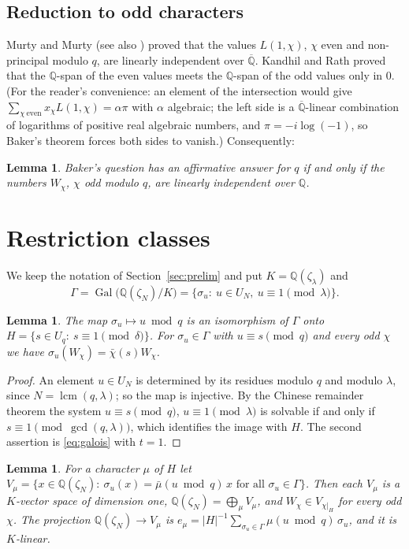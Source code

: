 \documentclass[11pt]{amsart}
\newtheorem{lemma}[theorem]{Lemma}
\theoremstyle{definition}
\theoremstyle{remark}
\providecommand{\Q}{\mathbb Q}
\newcommand{\Qb}{\overline{\mathbb Q}}
\DeclareMathOperator{\Gal}{Gal}
\numberwithin{equation}{section}
\begin{document}
\subsection{Reduction to odd characters}
Murty and Murty \cite{MM11} (see also \cite[Theorem~3]{KR22}) proved that the values $L(1,\chi)$, $\chi$ even and non-principal modulo $q$, are linearly independent over $\Qb$.
Kandhil and Rath \cite[Theorem~5]{KR22} proved that the $\Q$-span of the even values meets the $\Q$-span of the odd values only in $0$.
(For the reader's convenience: an element of the intersection would give $\sum_{\chi\ \mathrm{even}}x_\chi L(1,\chi)=\alpha\pi$ with $\alpha$ algebraic; the left side is a $\Qb$-linear combination of logarithms of positive real algebraic numbers, and $\pi=-i\log(-1)$, so Baker's theorem forces both sides to vanish.)
Consequently:

\begin{lemma}\label{lem:oddpart}
Baker's question has an affirmative answer for $q$ if and only if the numbers $W_\chi$, $\chi$ odd modulo $q$, are linearly independent over $\Q$.
\end{lemma}
\section{Restriction classes}\label{sec:classes}

We keep the notation of Section~\ref{sec:prelim} and put $K=\Q(\zeta_\lambda)$ and
\[
\Gamma=\Gal\bigl(\Q(\zeta_N)/K\bigr)=\{\sigma_u:\ u\in U_N,\ u\equiv1\pmod\lambda\}.
\]

\begin{lemma}\label{lem:Gamma}
The map $\sigma_u\mapsto u\bmod q$ is an isomorphism of $\Gamma$ onto $H=\{s\in U_q:\ s\equiv1\pmod\delta\}$.
For $\sigma_u\in\Gamma$ with $u\equiv s\pmod q$ and every odd $\chi$ we have $\sigma_u(W_\chi)=\bar\chi(s)W_\chi$.
\end{lemma}

\begin{proof}
An element $u\in U_N$ is determined by its residues modulo $q$ and modulo $\lambda$, since $N=\operatorname{lcm}(q,\lambda)$; so the map is injective.
By the Chinese remainder theorem the system $u\equiv s\pmod q$, $u\equiv1\pmod\lambda$ is solvable if and only if $s\equiv1\pmod{\gcd(q,\lambda)}$, which identifies the image with $H$.
The second assertion is \eqref{eq:galois} with $t=1$.
\end{proof}

\begin{lemma}\label{lem:eigen}
For a character $\mu$ of $H$ let $V_\mu=\{x\in\Q(\zeta_N):\ \sigma_u(x)=\bar\mu(u\bmod q)\,x\text{ for all }\sigma_u\in\Gamma\}$.
Then each $V_\mu$ is a $K$-vector space of dimension one, $\Q(\zeta_N)=\bigoplus_\mu V_\mu$, and $W_\chi\in V_{\chi|_H}$ for every odd $\chi$.
The projection $\Q(\zeta_N)\to V_\mu$ is $e_\mu=|H|^{-1}\sum_{\sigma_u\in\Gamma}\mu(u\bmod q)\,\sigma_u$, and it is $K$-linear.
\end{lemma}
\end{document}
